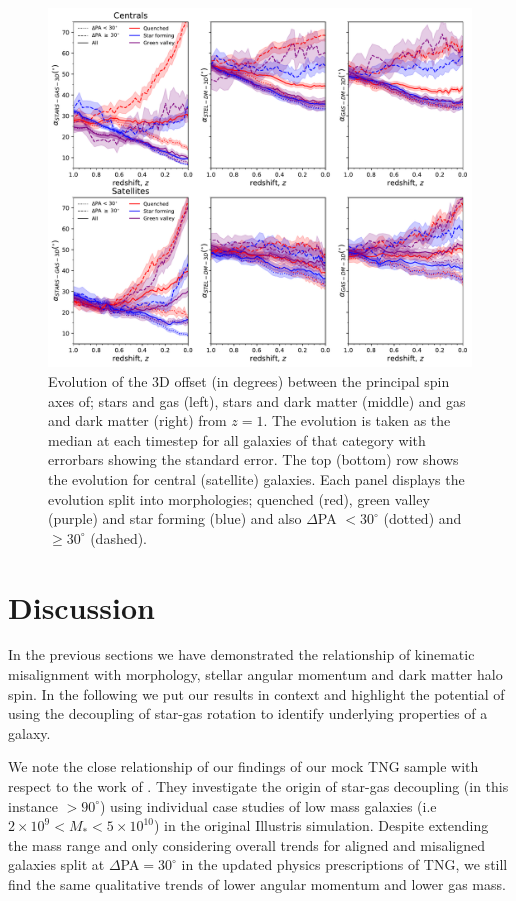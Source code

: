 \documentclass[fleqn,usenatbib]{mnras}
\begin{document}
\begin{figure}
	\includegraphics[width=\linewidth]{tng_results/3D_pa_evo_cen_sat.pdf}
    \caption{Evolution of the 3D offset (in degrees) between the principal spin axes of; stars and gas (left), stars and dark matter (middle) and gas and dark matter (right) from $z=1$. The evolution is taken as the median at each timestep for all galaxies of that category with errorbars showing the standard error. The top (bottom) row shows the evolution for central (satellite) galaxies. Each panel displays the evolution split into morphologies; quenched (red), green valley (purple) and star forming (blue) and also $\Delta$PA $< 30^{\circ}$ (dotted) and $\geq 30^{\circ}$ (dashed).}
    \label{fig:3D_alpha_evo}
\end{figure}

\section{Discussion} \label{sec:discussion}
In the previous sections we have demonstrated the relationship of kinematic misalignment with morphology, stellar angular momentum and dark matter halo spin. In the following we put our results in context and highlight the potential of using the decoupling of star-gas rotation to identify underlying properties of a galaxy. 

We note the close relationship of our findings of our mock TNG sample with respect to the work of \citet{starkenburg+19}. They investigate the origin of star-gas decoupling (in this instance $ > 90^{\circ}$) using individual case studies of low mass galaxies (i.e $2 \times 10^{9} < M_{\ast} < 5 \times 10^{10}$) in the original Illustris simulation. Despite extending the mass range and only considering overall trends for aligned and misaligned galaxies split at $\Delta$PA$= 30^{\circ}$ in the updated physics prescriptions of TNG, we still find the same qualitative trends of lower angular momentum and lower gas mass. 
\end{document}
